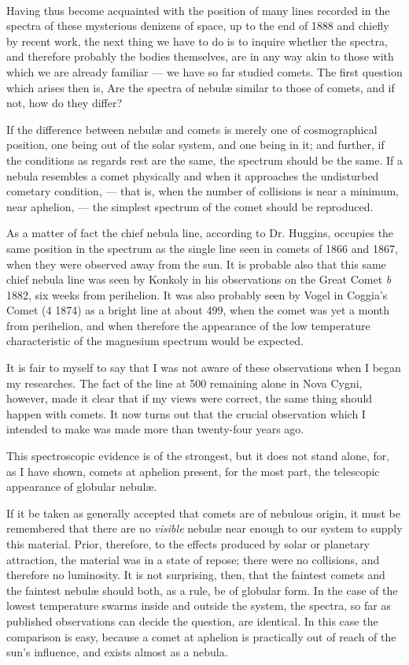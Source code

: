 \documentclass[a4paper, 12pt, oneside, polutonikogreek, english]{article}
\begin{document}
\paragraph{}
Having thus become acquainted with the position of many lines recorded in the spectra of these mysterious denizens of space, up to the end of 1888 and chiefly by recent work, the next thing we have to do is to inquire whether the spectra, and therefore probably the bodies themselves, are in any way akin to those with which we are already familiar --- we have so far studied comets. The first question which arises then is, Are the spectra of nebulæ similar to those of comets, and if not, how do they differ?

If the difference between nebulæ and comets is merely one of cosmographical position, one being out of the solar system, and one being in it; and further, if the conditions as regards rest are the same, the spectrum should be the same. If a nebula resembles a comet physically and when it approaches the undisturbed cometary condition, --- that is, when the number of collisions is near a minimum, near aphelion, --- the simplest spectrum of the comet should be reproduced.

As a matter of fact the chief nebula line, according to Dr. Huggins, occupies the same position in the spectrum as the single line seen in comets of 1866 and 1867, when they were observed away from the sun. It is probable also that this same chief nebula line was seen by Konkoly in his observations on the Great Comet \emph{b} 1882, six weeks from perihelion. It was also probably seen by Vogel in Coggia's Comet (4 1874) as a bright line at about 499, when the comet was yet a month from perihelion, and when therefore the appearance of the low temperature characteristic of the magnesium spectrum would be expected.

It is fair to myself to say that I was not aware of these observations when I began my researches. The fact of the line at 500 remaining alone in Nova Cygni, however, made it clear that if my views were correct, the same thing should happen with comets. It now turns out that the crucial observation which I intended to make was made more than twenty-four years ago.

This spectroscopic evidence is of the strongest, but it does not stand alone, for, as I have shown, comets at aphelion present, for the most part, the telescopic appearance of globular nebulæ.

If it be taken as generally accepted that comets are of nebulous origin, it must be remembered that there are no \emph{visible} nebulæ near enough to our system to supply this material. Prior, therefore, to the effects produced by solar or planetary attraction, the material was in a state of repose; there were no collisions, and therefore no luminosity. It is not surprising, then, that the faintest comets and the faintest nebulæ should both, as a rule, be of globular form. In the case of the lowest temperature swarms inside and outside the system, the spectra, so far as published observations can decide the question, are identical. In this case the comparison is easy, because a comet at aphelion is practically out of reach of the sun's influence, and exists almost as a nebula.
\end{document}
